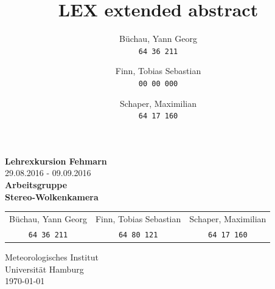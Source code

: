 \documentclass[a4paper,11pt,twoside,german]{article}
\title{LEX extended abstract}
\author{
    Büchau, Yann Georg \\
    \small{\texttt{64\,36\,211}}
    \and
    Finn, Tobias Sebastian \\
    \small{\texttt{00\,00\,000}}
    \and 
    Schaper, Maximilian \\
    \small{\texttt{64\,17\,160}}
    }
\newcommand{\smallborder}{2cm}
\newcommand{\topborder}{1cm}
\newcommand{\bottomborder}{1cm}
\begin{document}
\raggedbottom



\hypersetup{pageanchor=false}
\makeatletter
\begin{titlepage}



\vspace*{\fill}
\begin{center}
\Large{\textbf{Lehrexkursion Fehmarn}}\\
\large{29.08.2016 - 09.09.2016}\\
\vspace{5mm}
\Large{\textbf{Arbeitsgruppe\\Stereo-Wolkenkamera}}\\
\vspace{1cm}

\begin{large}
\begin{tabular}{ccc}
Büchau, Yann Georg & Finn, Tobias Sebastian & Schaper, Maximilian \\
\small{\texttt{64\,36\,211}} & 
\small{\texttt{64\,80\,121}} &
\small{\texttt{64\,17\,160}}
\end{tabular}
\end{large}

\vspace{1cm}
\large{Meteorologisches Institut}\\
\large{Universität Hamburg}\\
\vspace{1cm}
\large{{\today}}
\end{center}
\vspace*{\fill}

\clearpage


\end{titlepage}
\makeatother
\hypersetup{pageanchor=true}

\newpage

\clearpage
\setcounter{page}{1} %

\tableofcontents %
\vspace*{\fill}

\end{document}
